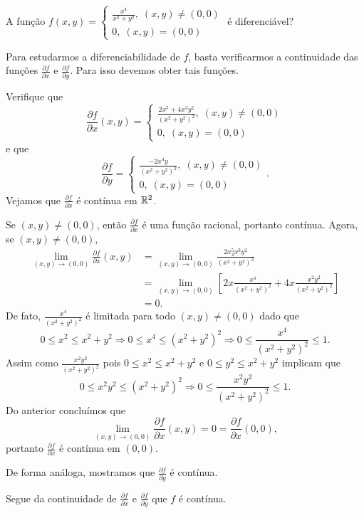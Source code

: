 \begin{example}
    A função \(f(x,y) = \begin{cases}
        \frac{x^4}{x^2+y^2},\; (x,y)\neq(0,0) \\
        0,\; (x,y)=(0,0)
    \end{cases}\) é diferenciável?

    Para estudarmos a diferenciabilidade de \(f\), basta verificarmos a continuidade das funções \(\frac{\partial f}{\partial x}\) e \(\frac{\partial f}{\partial y}\). Para isso devemos obter tais funções.

    Verifique que \[\frac{\partial f}{\partial x}(x,y) = \begin{cases}
        \frac{2x^5 + 4x^3y^2}{(x^2 + y^2)^2},\; (x,y)\neq(0,0) \\
        0,\; (x,y)=(0,0)
    \end{cases}\] e que \[ \frac{\partial f}{\partial y} = \begin{cases}
        \frac{-2x^4y}{(x^2+y^2)^2},\; (x,y)\neq(0,0)\\
        0,\; (x,y)=(0,0)
    \end{cases}.\] Vejamos que \(\frac{\partial f}{\partial x}\) é contínua em \(\mathbb{R}^2\).

    Se \((x,y)\neq(0,0)\), então \(\frac{\partial f}{\partial x}\) é uma função racional, portanto contínua. Agora, se \((x,y)\neq(0,0)\),
        \begin{align*}
            \lim_{(x,y)\to(0,0)} \frac{\partial f}{\partial x}(x,y)
                & = \lim_{(x,y)\to(0,0)} \frac{2x^5 _ 4x^3y^2}{(x^2+y^2)^2} \\
                & = \lim_{(x,y)\to(0,0)} \left[ 2x\frac{x^4}{(x^2+y^2)^2} + 4x\frac{x^2y^2}{(x^2+y^2)^2} \right]\\
                & = 0.
        \end{align*}
    De fato, \(\frac{x^4}{(x^2+y^2)^2}\) é limitada para todo \((x,y)\neq(0,0)\) dado que \[0\leq x^2 \leq x^2+y^2 \Rightarrow 0 \leq x^4 \leq (x^2+y^2)^2 \Rightarrow 0 \leq \frac{x^4}{(x^2+y^2)^2} \leq 1.\] Assim como \(\frac{x^2y^2}{(x^2+y^2)^2}\) pois \(0\leq x^2 \leq x^2+y^2\) e \(0\leq y^2 \leq x^2+y^2\) implicam que \[0 \leq x^2 y^2 \leq (x^2+y^2)^2 \Rightarrow 0 \leq \frac{x^2y^2}{(x^2+y^2)^2} \leq 1.\] Do anterior concluímos que \[\lim_{(x,y)\to(0,0)} \frac{\partial f}{\partial x}(x,y) = 0 = \frac{\partial f}{\partial x}(0,0),\] portanto \(\frac{\partial f}{\partial x}\) é contínua em \((0,0)\).

    De forma análoga, mostramos que \(\frac{\partial f}{\partial y}\) é contínua.

    Segue da continuidade de \(\frac{\partial f}{\partial x}\) e \(\frac{\partial f}{\partial y}\) que \(f\) é contínua.
\end{example}

